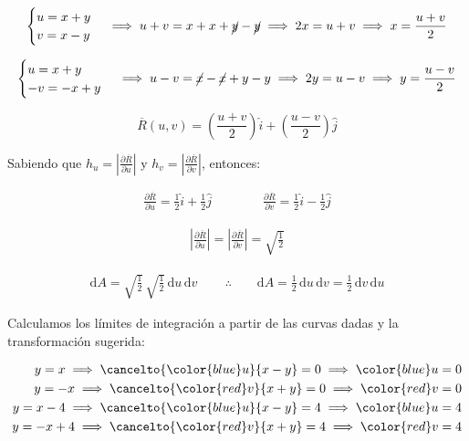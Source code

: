 \documentclass[12pt]{article}
\begin{document}
\begin{align*}
	\begin{cases}
		u = x+y\\
		v=x-y
	\end{cases} \implies u+v=x+x+\cancel{y}-\cancel{y} \implies 2x = u+v \implies x = \frac{u+v}{2}
\end{align*}

\begin{align*}
	\begin{cases}
		u = x+y\\
		-v = -x+y
	\end{cases} \implies u-v=\cancel{x}-\cancel{x}+y-y \implies 2y = u-v \implies y = \frac{u-v}{2}
\end{align*}

\begin{equation}\label{eqn:9-1}\tag{1}
	\overline{R}(u,v)=\left(\frac{u+v}{2}\right)\hat{i} + (\frac{u-v}{2})\hat{j}
\end{equation}

\noindent Sabiendo que $h_u = |\frac{\partial \overline{R}}{\partial u}|$ y $h_v = |\frac{\partial \overline{R}}{\partial v}|$, entonces:

\begin{align*}
	\frac{\partial \overline{R}}{\partial u} = \frac{1}{2}\hat{i} + \frac{1}{2}\hat{j} \qquad \qquad
	\frac{\partial \overline{R}}{\partial v} = \frac{1}{2}\hat{i} - \frac{1}{2}\hat{j}
\end{align*}

\begin{align*}
	\left|\frac{\partial \overline{R}}{\partial u}\right| = \left|\frac{\partial \overline{R}}{\partial v}\right| = \sqrt{\frac{1}{2}}
\end{align*}

\begin{align*}
	\mathrm{d}A = \sqrt{\frac{1}{2}}\,\sqrt{\frac{1}{2}}\, \mathrm{d}u\,\mathrm{d}v\, \qquad \therefore \qquad \mathrm{d}A = \frac{1}{2}\,\mathrm{d}u\,\mathrm{d}v = \frac{1}{2}\,\mathrm{d}v\,\mathrm{d}u
\end{align*}

\noindent Calculamos los límites de integración a partir de las curvas dadas y la transformación sugerida:

\begin{align*}
	y = x  \implies \cancelto{{\color{blue}u}}{x-y} = 0 \implies {\color{blue}u} = 0 \\
	y = -x \implies \cancelto{{\color{red}v}}{x+y} = 0 \implies {\color{red}v} = 0 \\
	y = x - 4 \implies \cancelto{{\color{blue}u}}{x-y} = 4 \implies {\color{blue}u} = 4 \\
	y = -x + 4 \implies \cancelto{{\color{red}v}}{x+y} = 4 \implies {\color{red}v} = 4 \\
\end{align*}
\end{document}
